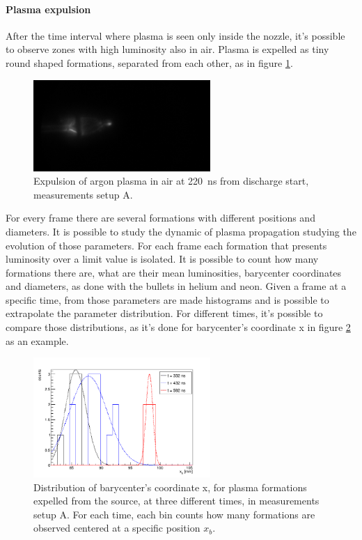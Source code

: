 \paragraph{Plasma expulsion}
After the time interval where plasma is seen only inside the nozzle, it's possible to observe zones with high luminosity also in air. Plasma is expelled as tiny round shaped formations, separated from each other, as in figure \ref{fig:arair_prop}.
\begin{figure}
 \centering
 \includegraphics[width=0.6\textwidth]{Images/Shape/argon_b_220.png}
 \caption{Expulsion of argon plasma in air at \SI{220}{\nano\second} from discharge start, measurements setup A.}
 \label{fig:arair_prop}
\end{figure}

For every frame there are several formations with different positions and diameters. It is possible to study the dynamic of plasma propagation studying the evolution of those parameters.
For each frame each formation that presents luminosity over a limit value is isolated. It is possible to count how many formations there are, what are their mean luminosities, barycenter coordinates and diameters, as done with the bullets in helium and neon.
Given a frame at a specific time, from those parameters are made histograms and is possible to extrapolate the parameter distribution. For different times, it's possible to compare those distributions, as it's done for barycenter's coordinate x in figure \ref{fig:argon_xb_evol} as an example. 
\begin{figure}
 \centering
 \includegraphics[width=0.6\textwidth]{Images/Shape/argon_b_xbevol.png}
 \caption{Distribution of barycenter's coordinate x, for plasma formations expelled from the source, at three different times, in measurements setup A. For each time, each bin counts how many formations are observed centered at a specific position $x_b$.}
 \label{fig:argon_xb_evol}
\end{figure}

